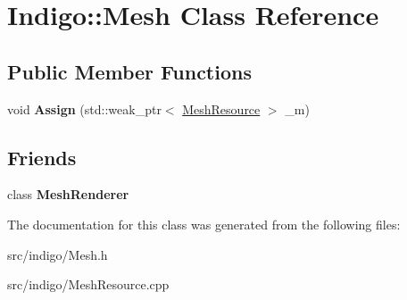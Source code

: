 \hypertarget{class_indigo_1_1_mesh}{}\section{Indigo\+:\+:Mesh Class Reference}
\label{class_indigo_1_1_mesh}
\subsection*{Public Member Functions}
\begin{DoxyCompactItemize}
\item 
\mbox{\label{class_indigo_1_1_mesh_a3bfaec6ece8be6d72bfec8e52569eb4c}} 
void {\bfseries Assign} (std\+::weak\+\_\+ptr$<$ \hyperlink{class_indigo_1_1_mesh_resource}{Mesh\+Resource} $>$ \+\_\+m)
\end{DoxyCompactItemize}
\subsection*{Friends}
\begin{DoxyCompactItemize}
\item 
\mbox{\label{class_indigo_1_1_mesh_aeba626af0b56820b14192cd581ebbf77}} 
class {\bfseries Mesh\+Renderer}
\end{DoxyCompactItemize}


The documentation for this class was generated from the following files\+:\begin{DoxyCompactItemize}
\item 
src/indigo/Mesh.\+h\item 
src/indigo/Mesh\+Resource.\+cpp\end{DoxyCompactItemize}
